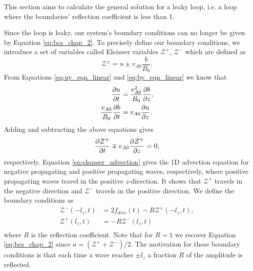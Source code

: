 This section aims to calculate the general solution for a leaky loop, i.e. a loop where the boundaries' reflection coefficient is less than 1.

Since the loop is leaky, our system's boundary conditions can no longer be given by Equation \eqref{eq:bcs_chap_2}. To precisely define our boundary conditions, we introduce a set of variables called Els\"asser variables $\mathcal{Z}^+$, $\mathcal{Z}^-$ which are defined as
\begin{equation}
    \label{eq:elsasser_z}
    \mathcal{Z}^\pm = u \pm v_{A0}\frac{b}{B_0}.
\end{equation}
From Equations \eqref{eq:uy_eqn_linear} and \eqref{eq:by_eqn_linear} we know that
\begin{equation}
    \begin{aligned}
    \pdv{u}{t} &= \frac{v_{A0}^2}{B_0}\pdv{b}{z}, \\
    \frac{v_{A0}}{B_0}\pdv{b}{t} &= v_{A0}\pdv{u}{z}.
    \end{aligned}
\end{equation}
Adding and subtracting the above equations gives
\begin{equation}
    \label{eq:elsasser_advection}
    \pdv{\mathcal{Z}^\pm}{t}\mp v_{A0}\pdv{\mathcal{Z}^\pm}{z}=0,
\end{equation}
respectively. Equation \eqref{eq:elsasser_advection} gives the 1D advection equation for negative propagating and positive propagating waves, respectively, where positive propagating waves travel in the positive $z$-direction. It shows that $\mathcal{Z}^+$ travels in the negative direction and $\mathcal{Z}^-$ travels in the positive direction. We define the boundary conditions as 
\begin{equation}
    \label{eq:bcs_elsasser}
    \begin{aligned}
    \mathcal{Z}^-(-l_z, t) &= 2f_{driv}(t) - R \mathcal{Z}^+(-l_z, t), \\
    \mathcal{Z}^+(l_z, t) &= -R \mathcal{Z}^-(l_z, t) \\
    \end{aligned}
\end{equation}
where $R$ is the reflection coefficient. Note that for $R=1$ we recover Equation \eqref{eq:bcs_chap_2} since $u = (\mathcal{Z}^+ + \mathcal{Z}^-) / 2$. The motivation for these boundary conditions is that each time a wave reaches $\pm l_z$ a fraction $R$ of the amplitude is reflected.

